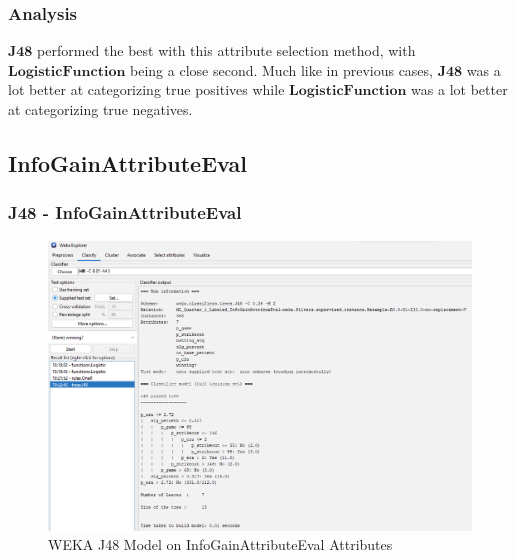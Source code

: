 \documentclass[12pt]{article}
\begin{document}
\newpage
\subsubsection{Analysis}
$\textbf{J48}$ performed the best with this attribute selection method, with $\textbf{LogisticFunction}$ being a close second. Much like in previous cases, $\textbf{J48}$ was a lot better at categorizing true positives while $\textbf{LogisticFunction}$ was a lot better at categorizing true negatives. 

\newpage
\subsection{InfoGainAttributeEval}

\subsubsection{J48 - InfoGainAttributeEval}
\begin{figure}[h!]
    \includegraphics[scale=0.4]{./images/InfoGainAttributeEval/J48-Model.png}
\centering
    \caption{WEKA J48 Model on InfoGainAttributeEval Attributes}
\end{figure}
\newpage
\end{document}
